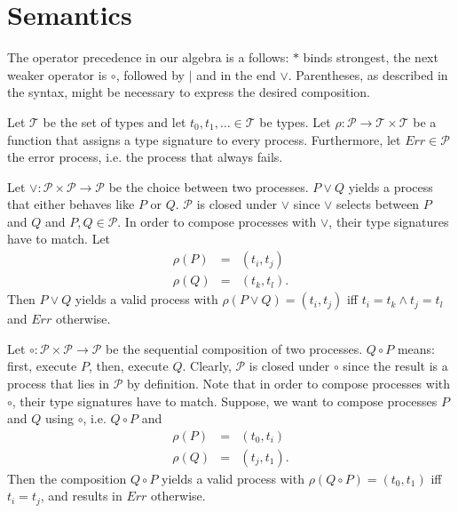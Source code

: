 \section{Semantics}
The operator precedence in our algebra is a follows: $*$ binds strongest, the next weaker operator is $\circ$, followed by $|$ and in the end $\vee$. Parentheses, as described in the syntax, might be necessary to express the desired composition.

Let $\mathcal{T}$ be the set of types and let $t_0, t_1, \ldots \in \mathcal{T}$ be types. Let $\rho \colon \mathcal{P} \to \mathcal{T} \times \mathcal{T}$ be a function that assigns a type signature to every process. Furthermore, let $Err \in \mathcal{P}$ the error process, i.e. the process that always fails.

Let $\vee \colon \mathcal{P} \times \mathcal{P} \to \mathcal{P}$ be the choice between two processes. $P \vee Q$ yields a process that either behaves like $P$ or $Q$. $\mathcal{P}$ is closed under $\vee$ since $\vee$ selects between $P$ and $Q$ and $P, Q \in \mathcal{P}$. In order to compose processes with $\vee$, their type signatures have to match. Let
\begin{eqnarray*}
  \rho \left( P \right) & = & \left( t_i, t_j \right) \\
  \rho \left( Q \right) & = & \left( t_k, t_l \right).
\end{eqnarray*}
Then $P \vee Q$ yields a valid process with $\rho \left( P \vee Q \right) = \left( t_i, t_j \right)$ iff $t_i = t_k \wedge t_j = t_l$ and $Err$ otherwise.

Let $\circ \colon \mathcal{P} \times \mathcal{P} \to \mathcal{P}$ be the sequential composition of two processes. $Q \circ P$ means: first, execute $P$, then, execute $Q$. Clearly, $\mathcal{P}$ is closed under $\circ$ since the result is a process that lies in $\mathcal{P}$ by definition. Note that in order to compose processes with $\circ$, their type signatures have to match. Suppose, we want to compose processes $P$ and $Q$ using $\circ$, i.e. $Q \circ P$ and
\begin{eqnarray*}
  \rho \left( P \right) & = & \left( t_0, t_i \right) \\
  \rho \left( Q \right) & = & \left( t_j, t_1 \right).
\end{eqnarray*}
Then the composition $Q \circ P$ yields a valid process with $\rho \left( Q \circ P \right) = \left( t_0, t_1 \right)$ iff $t_i = t_j$, and results in $Err$ otherwise. 

